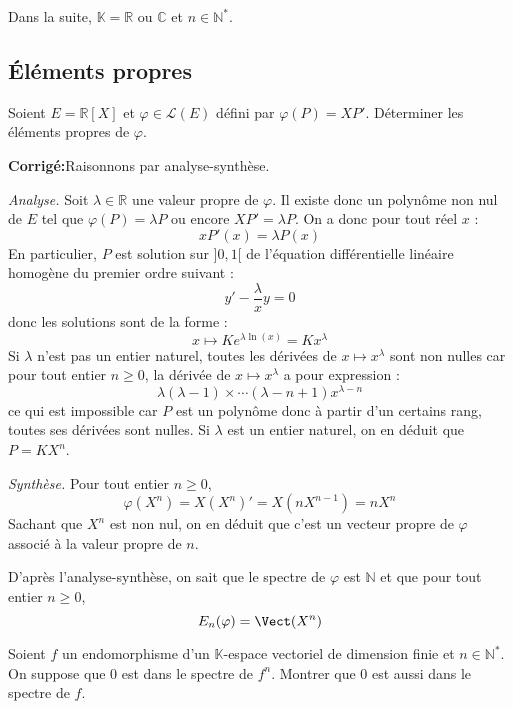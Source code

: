 \documentclass[a4paper,twoside,french,10pt]{VcCours}
\newcommand{\corr}{\textbf{Corrigé:}}
\begin{document}

\tableofcontents
\separationTitre


Dans la suite, $\mathbb{K} = \mathbb{R}$ ou $\mathbb{C}$ et $n \in \mathbb{N}^*$.


\subsection{Éléments propres}


\begin{Exercice}{} Soient $E = \mathbb{R}[X]$ et $\varphi \in \mathcal{L}(E)$ défini par $\varphi(P)=XP'$. Déterminer les éléments propres de $\varphi$.
\end{Exercice}

\corr Raisonnons par analyse-synthèse. 


\textit{Analyse.} Soit $\lambda \in \mathbb{R}$ une valeur propre de $\varphi$. Il existe donc un polynôme non nul de $E$ tel que $\varphi(P)=\lambda P$ ou encore $XP' = \lambda P$. On a donc pour tout réel $x$ :
$$ x P'(x) = \lambda P(x)$$
En particulier, $P$ est solution sur $]0,1[$ de l'équation différentielle linéaire homogène du premier ordre suivant :
$$ y' - \dfrac{\lambda}{x} y = 0$$
donc les solutions sont de la forme :
$$ x \mapsto K e^{\lambda \ln(x)} = K x^{\lambda}$$
Si $\lambda$ n'est pas un entier naturel, toutes les dérivées de $x \mapsto x^{\lambda}$ sont non nulles car pour tout entier $n \geq 0$, la dérivée de $x \mapsto x^{\lambda}$ a pour expression :
$$ \lambda (\lambda-1) \times \cdots (\lambda-n+1) x^{\lambda -n}$$
ce qui est impossible car $P$ est un polynôme donc à partir d'un certains rang, toutes ses dérivées sont nulles. Si $\lambda$ est un entier naturel, on en déduit que $P= K X^n$.


\textit{Synthèse.} Pour tout entier $n \geq 0$,
$$ \varphi(X^n) = X(X^n)'=X(nX^{n-1})=nX^n$$
Sachant que $X^n$ est non nul, on en déduit que c'est un vecteur propre de $\varphi$ associé à la valeur propre de $n$.


D'après l'analyse-synthèse, on sait que le spectre de $\varphi$ est $\mathbb{N}$ et que pour tout entier $n \geq 0$,
$$ E_{n}(\varphi) = \Vect(X^n)$$

\begin{Exercice}{} Soient $f$ un endomorphisme d'un $\mathbb{K}$-espace vectoriel de dimension finie et $n \in \mathbb{N}^{*}$. On suppose que $0$ est dans le spectre de $f^n$. Montrer que $0$ est aussi dans le spectre de $f$.
\end{Exercice}
\end{document}
